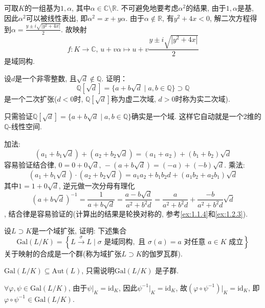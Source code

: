 \begin{solution}
\begin{enumerate}[(1)]
    可取$K$的一组基为$1, \alpha$, 其中$\alpha \in \mathbb{C} \setminus \mathbb{R}$.
    不可避免地要考虑$\alpha^2$的结果, 由于$1, \alpha$是基, 因此$\alpha^2$可以被线性表出,
    即$\alpha^2 = x + y\alpha$. 由于$\alpha \notin \mathbb{R}$, 有$y^2 + 4x < 0$,
    解二次方程得到$\alpha = \frac{y \pm i\sqrt{|y^2 + 4x|}}{2}$.
    故映射
\[
    f: K \to \mathbb{C},\, u + v\alpha \mapsto u + v\frac{y \pm i\sqrt{|y^2 + 4x|}}{2}
\]
    是域同构.
\end{enumerate}
\end{solution}

\begin{problem}
    设$d$是一个非零整数, 且$\sqrt d \notin \mathbb{Q}$. 证明：
\[
    \mathbb{Q}[\sqrt{d}] = \{a + b\sqrt{d} \mid a, b \in \mathbb{Q}\} \supset \mathbb{Q}
\]
是一个二次扩张($d < 0$时, $\mathbb{Q}[\sqrt{d}]$称为虚二次域, $d > 0$时称为实二次域).
\end{problem}

\begin{solution}
    只需验证$\mathbb{Q}[\sqrt{d}] = \{a + b\sqrt{d} \mid a, b \in \mathbb{Q}\}$确实是一个域. 这样它自动就是一个$2$维的$\mathbb{Q}$-线性空间.
    
    加法:
    \[
        (a_1 + b_1\sqrt{d}) + (a_2 + b_2\sqrt{d}) = (a_1 + a_2) + (b_1 + b_2)\sqrt{d}
    \]
    容易验证结合律, $0 = 0 + 0\sqrt{d},\, -(a + b\sqrt{d}) = (-a) + (-b)\sqrt{d}$.
    乘法:
    \[
        (a_1 + b_1\sqrt{d}) \cdot (a_2 + b_2\sqrt{d}) = a_1a_2 + b_1b_2d + (a_1b_2 + a_2b_1)\sqrt{d}
    \]
    其中$1 = 1 + 0\sqrt{d}$, 逆元做一次分母有理化
    \[
        (a + b\sqrt{d})^{-1} = \frac{1}{a + b\sqrt{d}} = \frac{a - b\sqrt{d}}{a^2 + b^2d} = \frac{a}{a^2 + b^2d} + \frac{- b}{a^2 + b^2d}\sqrt{d}
    \],
    结合律是容易验证的(计算出的结果是轮换对称的, 参考\ref{ex:1.1.4}和\ref{ex:1.2.3}).
\end{solution}

\begin{problem}
    设$L \supset K$是一个域扩张, 证明: 下述集合
\[
\mathrm{Gal}(L/K)=
\left\{L \xrightarrow{\sigma} L \mid \sigma\text{ 是域同构},\text{ 且 } \sigma(a) = a \text{ 对任意 } a \in K \text{ 成立}\right\}
\]
关于映射的合成是一个群(称为域扩张$L\supset K$的伽罗瓦群).
\end{problem}

\begin{solution}
    $\mathrm{Gal}(L/K) \subseteq \mathrm{Aut}(L)$, 只需说明$\mathrm{Gal}(L/K)$
是子群.

    $\forall \varphi, \psi \in \mathrm{Gal}(L/K)$, 由于$\psi|_K = \mathrm{id}_K$,
因此$\psi^{-1}|_K = \mathrm{id}_K$, 故$(\varphi \circ \psi^{-1})|_K = \mathrm{id}_K$,
即$\varphi \circ \psi^{-1} \in \mathrm{Gal}(L/K)$.
\end{solution}

